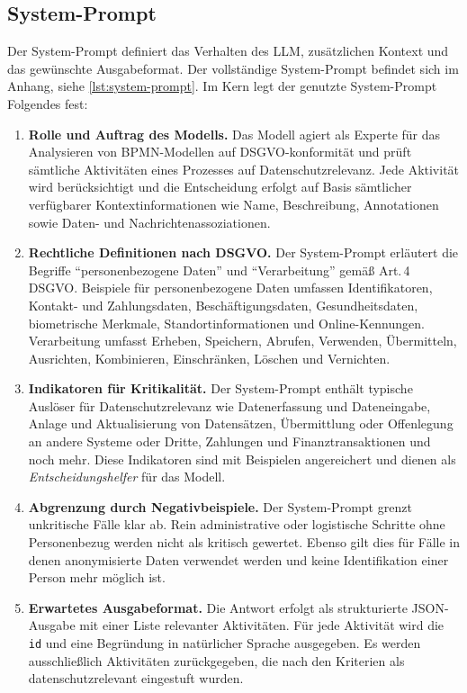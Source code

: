 \subsection*{System-Prompt}

Der System-Prompt definiert das Verhalten des \ac{LLM}, zusätzlichen Kontext und das gewünschte Ausgabeformat. Der vollständige System-Prompt befindet sich im Anhang, siehe \ref{lst:system-prompt}. Im Kern legt der genutzte System-Prompt Folgendes fest:

\begin{enumerate}
    \item \textbf{Rolle und Auftrag des Modells.} Das Modell agiert als Experte für das Analysieren von \ac{BPMN}-Modellen auf \ac{DSGVO}-konformität und prüft sämtliche Aktivitäten eines Prozesses auf Datenschutzrelevanz. Jede Aktivität wird berücksichtigt und die Entscheidung erfolgt auf Basis sämtlicher verfügbarer Kontextinformationen wie Name, Beschreibung, Annotationen sowie Daten- und Nachrichtenassoziationen.
    \item \textbf{Rechtliche Definitionen nach \ac{DSGVO}.} Der System-Prompt erläutert die Begriffe \enquote{personenbezogene Daten} und \enquote{Verarbeitung} gemäß Art.\,4 \ac{DSGVO}. Beispiele für personenbezogene Daten umfassen Identifikatoren, Kontakt- und Zahlungsdaten, Beschäftigungsdaten, Gesundheitsdaten, biometrische Merkmale, Standortinformationen und Online-Kennungen. Verarbeitung umfasst Erheben, Speichern, Abrufen, Verwenden, Übermitteln, Ausrichten, Kombinieren, Einschränken, Löschen und Vernichten.
    \item \textbf{Indikatoren für Kritikalität.} Der System-Prompt enthält typische Auslöser für Datenschutzrelevanz wie Datenerfassung und Dateneingabe, Anlage und Aktualisierung von Datensätzen, Übermittlung oder Offenlegung an andere Systeme oder Dritte, Zahlungen und Finanztransaktionen und noch mehr. Diese Indikatoren sind mit Beispielen angereichert und dienen als \emph{Entscheidungshelfer} für das Modell.
    \item \textbf{Abgrenzung durch Negativbeispiele.} Der System-Prompt grenzt unkritische Fälle klar ab. Rein administrative oder logistische Schritte ohne Personenbezug werden nicht als kritisch gewertet. Ebenso gilt dies für Fälle in denen anonymisierte Daten verwendet werden und keine Identifikation einer Person mehr möglich ist.
    \item \textbf{Erwartetes Ausgabeformat.} Die Antwort erfolgt als strukturierte JSON-\hspace{0pt}Ausgabe mit einer Liste relevanter Aktivitäten. Für jede Aktivität wird die \texttt{id} und eine Begründung in natürlicher Sprache ausgegeben. Es werden ausschließlich Aktivitäten zurückgegeben, die nach den Kriterien als datenschutzrelevant eingestuft wurden.
\end{enumerate}

